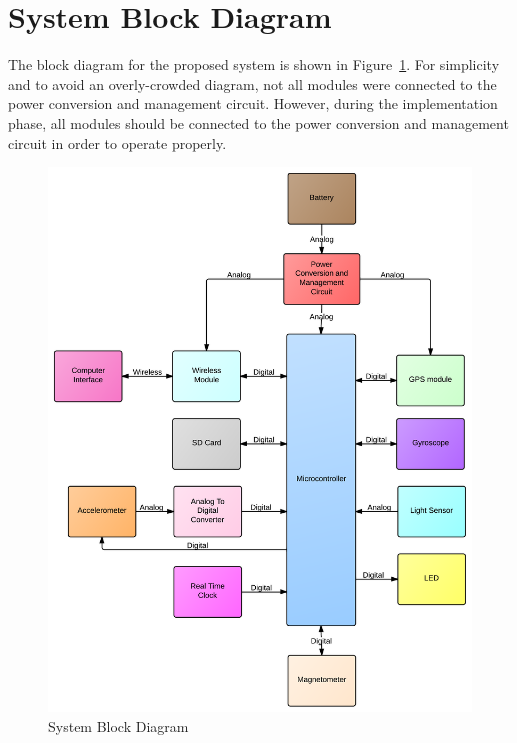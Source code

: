 \section{System Block Diagram}
The block diagram for the proposed system is shown in Figure~\ref{fig:blockDiagram}. For simplicity and to avoid an overly-crowded diagram, not all modules were connected to the power conversion and management circuit. However, during the implementation phase, all modules should be connected to the power conversion and management circuit in order to operate properly.
\begin{figure}[ht!]
	\centering
	\includegraphics[scale=0.16]{img/blockdiagram.png}
	\caption{System Block Diagram \label{fig:blockDiagram}}
\end{figure}
